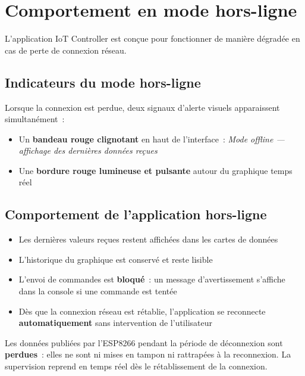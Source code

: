 \documentclass[a4paper,12pt]{article}
\newcommand{\dangerbox}[2]{%
  \begin{tcolorbox}[mybox,
    colback=LightRed, colframe=DangerRed,
    colbacktitle=DangerRed, coltitle=white,
    title={$\times$\enspace #1}]#2\end{tcolorbox}}
\begin{document}
\section{Comportement en mode hors-ligne}

L'application IoT Controller est con\c{c}ue pour fonctionner de mani\`ere d\'egrad\'ee
en cas de perte de connexion r\'eseau.

\subsection{Indicateurs du mode hors-ligne}

Lorsque la connexion est perdue, deux signaux d'alerte visuels apparaissent simultan\'ement~:

\begin{itemize}[noitemsep]
  \item Un \textbf{bandeau rouge clignotant} en haut de l'interface~:
        \textit{Mode offline --- affichage des derni\`eres donn\'ees re\c{c}ues}
  \item Une \textbf{bordure rouge lumineuse et pulsante} autour du graphique temps r\'eel
\end{itemize}

\subsection{Comportement de l'application hors-ligne}

\begin{itemize}[noitemsep]
  \item Les derni\`eres valeurs re\c{c}ues restent affich\'ees dans les cartes de donn\'ees
  \item L'historique du graphique est conserv\'e et reste lisible
  \item L'envoi de commandes est \textbf{bloqu\'e}~: un message d'avertissement s'affiche
        dans la console si une commande est tent\'ee
  \item D\`es que la connexion r\'eseau est r\'etablie, l'application se reconnecte
        \textbf{automatiquement} sans intervention de l'utilisateur
\end{itemize}

\dangerbox{Perte de donn\'ees en mode hors-ligne}{
Les donn\'ees publi\'ees par l'ESP8266 pendant la p\'eriode de d\'econnexion sont
\textbf{perdues}~: elles ne sont ni mises en tampon ni rattrap\'ees \`a la reconnexion.
La supervision reprend en temps r\'eel d\`es le r\'etablissement de la connexion.
}
\end{document}
